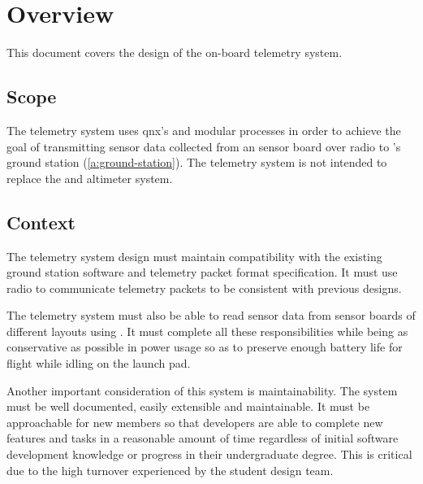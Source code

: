 \section{Overview}

This document covers the design of the  on-board telemetry system.

\subsection{Scope}

The telemetry system uses \gls{qnx}'s  and modular processes in order to achieve the goal of
transmitting sensor data collected from an  sensor board over  radio to
's  ground station (\ref{a:ground-station}). The telemetry system is not
intended to replace the   and altimeter system.

\subsection{Context}

The  telemetry system design must maintain compatibility with the existing ground station
software and telemetry packet format specification. It must use  radio to communicate telemetry
packets to be consistent with previous designs.

The telemetry system must also be able to read sensor data from  sensor boards of different layouts
using . It must complete all these responsibilities while being as conservative as possible in power
usage so as to preserve enough battery life for flight while idling on the launch pad.

Another important consideration of this system is maintainability. The system must be well documented, easily
extensible and maintainable. It must be approachable for new  members so that developers are
able to complete new features and tasks in a reasonable amount of time regardless of initial software development
knowledge or progress in their undergraduate degree. This is critical due to the high turnover experienced by the
student design team.

